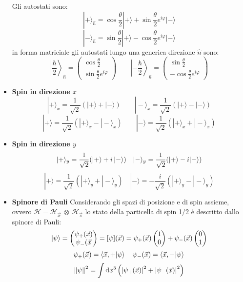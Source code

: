 \documentclass{book}
\newcommand{\g}{\textbf}
\newcommand{\e}{\begin{equation}}
\newcommand{\ex}{\end{equation} }
\renewcommand{\it}{\item[$\cdot$]}
\begin{document}
\begin{multicols}{4}
\begin{itemize}
    Gli autostati sono:
    \e{|+\rangle_{\hat{n}} = \cos\frac{\theta}{2}  |+\rangle + \sin\frac{\theta}{2} e^{i{\varphi}} |-\rangle} \ex
    \e{|-\rangle_{\hat{n}} = \sin\frac{\theta}{2} |+\rangle - \cos\frac{\theta}{2} e^{i{\varphi}} |-\rangle} \ex
in forma matriciale gli autostati lungo una generica direzione $\hat{n}$ sono:
    \e{\left|\frac{\hbar}{2}\right\rangle_{\hat{n}} =
    \begin{pmatrix}
        \cos\frac{\theta}{2}  \\
        \sin\frac{\theta}{2} e^{i{\varphi}}
    \end{pmatrix} \qquad \left|-\frac{\hbar}{2}\right\rangle_{\hat{n}} =
    \begin{pmatrix}
        \sin\frac{\theta}{2}  \\
        -\cos\frac{\theta}{2} e^{i{\varphi}}
    \end{pmatrix}} \ex
\it \g{Spin in direzione $x$}
    \e{|+\rangle_x = \frac{1}{\sqrt{2}}(|+\rangle + |-\rangle) \qquad |-\rangle_x = \frac{1}{\sqrt{2}}(|+\rangle - |-\rangle)} \ex
    \e{|+\rangle = \frac{1}{\sqrt{2}}(|+\rangle_x - |-\rangle_x) \qquad |-\rangle = \frac{1}{\sqrt{2}}(|+\rangle_x + |-\rangle_x)} \ex
\it \g{Spin in direzione $y$}
    \e{|+\rangle_y = \frac{1}{\sqrt{2}}(\ket{+} + i\ket{-}) \quad |-\rangle_y = \frac{1}{\sqrt{2}}(|+\rangle -i|-\rangle)} \ex
    \e{|+\rangle = \frac{1}{\sqrt{2}}(|+\rangle_y + |-\rangle_y) \quad |-\rangle = -\frac{i}{\sqrt{2}}(|+\rangle_y - |-\rangle_y)} \ex
    \it \g{Spinore di Pauli}
    Considerando gli spazi di posizione e di spin assieme, ovvero $\mathcal{H} = \mathcal{H}_{\vec{x}} \ \otimes \ \mathcal{H}_{\vec{s}} $ lo stato della particella di spin 1/2 è descritto dallo spinore di Pauli:
    \e{\ket{\psi} = \begin{pmatrix}
        \psi_{+}(\vec{x})\\
        \psi_{-}(\vec{x} 
    \end{pmatrix} = [\psi](\vec{x}) = \psi_{+}(\vec{x})\begin{pmatrix}
        1 \\ 0
    \end{pmatrix} + \psi_{-}(\vec{x}) \begin{pmatrix}
        0 \\ 1
    \end{pmatrix}}\ex
    \e{\psi_{+}(\vec{x}) = \braket{\vec{x}, +}{\psi} \quad \psi_{-}(\vec{x}) = \braket{\vec{x},-}{\psi}}\ex
    \e{\norm{\psi}^{2} = \int \text{d}x^{3}\left(\left|\psi_{+}(\vec{x})\right|^{2} + \left|\psi_{-}(\vec{x})\right|^{2}\right)}\ex

\end{itemize}
\end{multicols}
\end{document}

